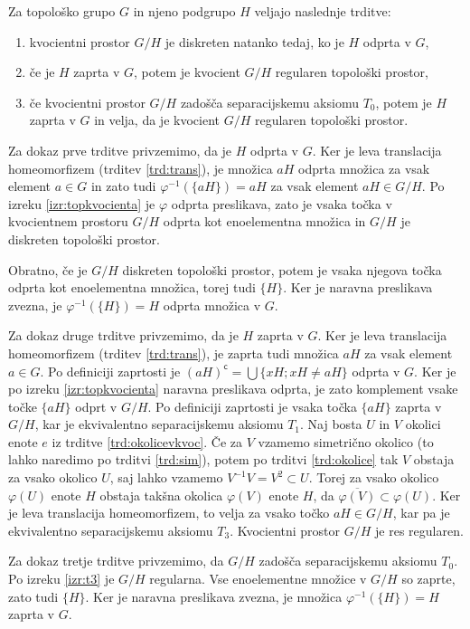 \documentclass[mat1]{fmfdelo}
\newcommand{\closure}[1]{\overline{#1}}
\newcommand{\setcomp}[1]{{#1}^{\mathsf{c}}}
\begin{document}
\begin{izrek}\label{izr:kvocreg}
Za topološko grupo $G$ in njeno podgrupo $H$ veljajo naslednje trditve:
\begin{enumerate}
\item kvocientni prostor $G/H$ je diskreten natanko tedaj, ko je $H$ odprta v $G$,
\item če je $H$ zaprta v $G$, potem je kvocient $G/H$ regularen topološki prostor,
\item če kvocientni prostor $G/H$ zadošča separacijskemu aksiomu $T_0$, potem je $H$ zaprta v $G$ in velja, da je kvocient $G/H$ regularen topološki prostor.
\end{enumerate}
\end{izrek}

\begin{dokaz}
Za dokaz prve trditve privzemimo, da je $H$ odprta v $G$. Ker je leva translacija homeomorfizem (trditev \ref{trd:trans}), je množica $aH$ odprta množica za vsak element $a \in G$ in zato tudi $\varphi^{-1}(\lbrace aH \rbrace) = aH$ za vsak element $aH \in G/H$. Po izreku \ref{izr:topkvocienta} je $\varphi$ odprta preslikava, zato je vsaka točka v kvocientnem prostoru $G/H$ odprta kot enoelementna množica in $G/H$ je diskreten topološki prostor.

Obratno, če je $G/H$ diskreten topološki prostor, potem je vsaka njegova točka odprta kot enoelementna množica, torej tudi $\lbrace H \rbrace$. Ker je naravna preslikava zvezna, je $\varphi^{-1}(\lbrace H \rbrace) = H$ odprta množica v $G$.

Za dokaz druge trditve privzemimo, da je $H$ zaprta v $G$. Ker je leva translacija homeomorfizem (trditev \ref{trd:trans}), je zaprta tudi množica $aH$ za vsak element $a \in G$. Po definiciji zaprtosti je $\setcomp{(aH)} = \bigcup \lbrace xH ; xH \neq aH \rbrace$ odprta v $G$. Ker je po izreku \ref{izr:topkvocienta} naravna preslikava odprta, je zato komplement vsake točke $\lbrace aH \rbrace$ odprt v $G/H$. Po definiciji zaprtosti je vsaka točka $\lbrace aH \rbrace$ zaprta v $G/H$, kar je ekvivalentno separacijskemu aksiomu $T_1$. Naj bosta $U$ in $V$ okolici enote $e$ iz trditve \ref{trd:okolicevkvoc}. Če za $V$ vzamemo simetrično okolico (to lahko naredimo po trditvi \ref{trd:sim}), potem po trditvi \ref{trd:okolice} tak $V$ obstaja za vsako okolico $U$, saj lahko vzamemo $V^{-1}V = V^2 \subset U$. Torej za vsako okolico $\varphi(U)$ enote $H$ obstaja takšna okolica $\varphi(V)$ enote $H$, da $\closure{\varphi(V)} \subset \varphi(U)$. Ker je leva translacija homeomorfizem, to velja za vsako točko $aH \in G/H$, kar pa je ekvivalentno separacijskemu aksiomu $T_3$. Kvocientni prostor $G/H$ je res regularen.

Za dokaz tretje trditve privzemimo, da $G/H$ zadošča separacijskemu aksiomu $T_0$. Po izreku \ref{izr:t3} je $G/H$ regularna. Vse enoelementne množice v $G/H$ so zaprte, zato tudi $\lbrace H \rbrace$. Ker je naravna preslikava zvezna, je množica $\varphi^{-1}(\lbrace H \rbrace) = H$ zaprta v $G$.
\end{dokaz}
\end{document}
